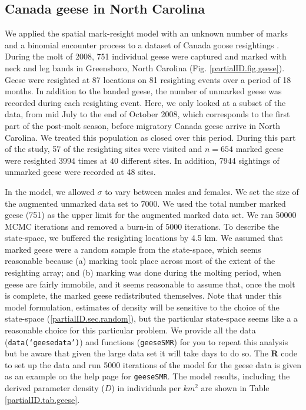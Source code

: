 \subsection{Canada geese in North Carolina}

We applied the spatial mark-resight model with an unknown number of
marks and a binomial encounter process to a dataset of Canada goose
resightings \citep{rutledge:2012}. During the molt of 2008, 751 individual geese were captured
and marked with neck and leg bands in Greensboro, North Carolina
(Fig. \ref{partialID.fig.geese}). Geese were resighted at 87 locations
on 81 resighting events over a period of 18 months. In addition to the
banded geese, the number of unmarked geese was recorded during each
resighting event. Here, we only looked at a subset of the data, from
mid July to the end of October 2008, which corresponds to the first
part of the post-molt season, before migratory Canada geese arrive in
North Carolina. We treated this population as closed over this period.
During this part of the study, 57 of the resighting sites were visited
and $n = 654$ marked geese were resighted 3994 times at 40 different
sites. In addition, 7944 sightings of unmarked geese were recorded at
48 sites.

In the model, we allowed $\sigma$ to vary between males and
females. We set the size of the augmented unmarked data set to 7000. We used the total number marked geese (751) as the upper limit for the augmented marked data set. We ran 50000 MCMC iterations and removed a burn-in of 5000 iterations. To describe the state-space, we buffered the resighting locations by 4.5 km. We assumed that marked geese were a random sample from the state-space, which seems reasonable because (a) marking took place across most of the extent of the resighting array; and (b) marking was done during the molting period, when geese are fairly immobile, and it seems reasonable to assume that, once the molt is complete, the marked geese redistributed themselves.
Note that under this model formulation, estimates of density will be sensitive to the choice of the state-space (\ref{partialID.sec.random}), but the particular state-space seems like a a reasonable choice for this particular problem.
We provide all the data ({\tt data(`geesedata')}) and functions ({\tt geeseSMR}) for you to repeat this analysis but be aware that given the large data set it will take days to do so. The {\bf R} code to set up the data and run 5000 iterations of the model for the geese data is given as an example on the help page for {\tt geeseSMR}. The model results, including the derived parameter density ($D$) in individuals per $km^2$ are shown in Table \ref{partialID.tab.geese}.


